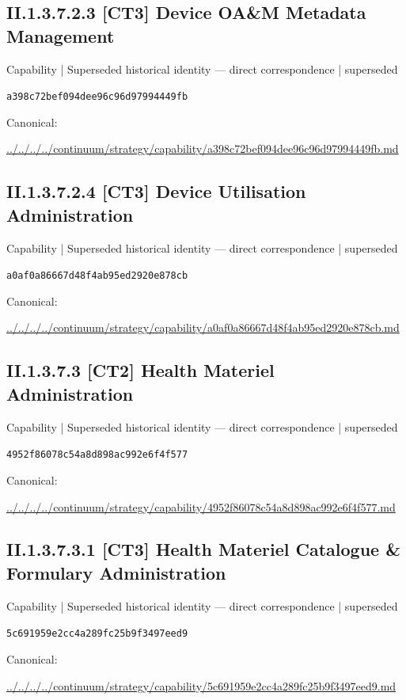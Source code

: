 \documentclass[10pt,a4paper]{article}
\begin{document}
\subsection*{II.1.3.7.2.3 [CT3] Device OA\&M Metadata Management}
{\small Capability | Superseded historical identity — direct correspondence | superseded}\par
\texttt{a398c72bef094dee96c96d97994449fb}\par
Canonical: \par
{\footnotesize\url{../../../../continuum/strategy/capability/a398c72bef094dee96c96d97994449fb.md}}\par
\subsection*{II.1.3.7.2.4 [CT3] Device Utilisation Administration}
{\small Capability | Superseded historical identity — direct correspondence | superseded}\par
\texttt{a0af0a86667d48f4ab95ed2920e878cb}\par
Canonical: \par
{\footnotesize\url{../../../../continuum/strategy/capability/a0af0a86667d48f4ab95ed2920e878cb.md}}\par
\subsection*{II.1.3.7.3 [CT2] Health Materiel Administration}
{\small Capability | Superseded historical identity — direct correspondence | superseded}\par
\texttt{4952f86078c54a8d898ac992e6f4f577}\par
Canonical: \par
{\footnotesize\url{../../../../continuum/strategy/capability/4952f86078c54a8d898ac992e6f4f577.md}}\par
\subsection*{II.1.3.7.3.1 [CT3] Health Materiel Catalogue \& Formulary Administration}
{\small Capability | Superseded historical identity — direct correspondence | superseded}\par
\texttt{5c691959e2cc4a289fc25b9f3497eed9}\par
Canonical: \par
{\footnotesize\url{../../../../continuum/strategy/capability/5c691959e2cc4a289fc25b9f3497eed9.md}}\par
\end{document}
